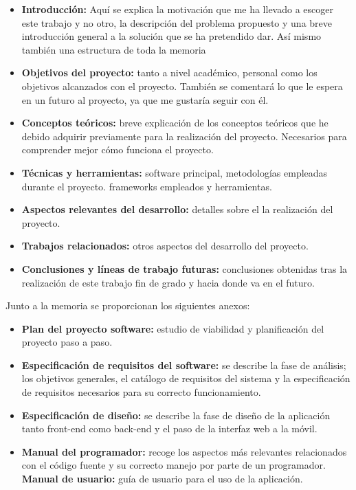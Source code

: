 \begin{itemize}
\tightlist
\item
  \textbf{Introducción:} Aquí se explica la motivación que me ha llevado a escoger este trabajo y no otro, la descripción del problema propuesto y una breve introducción general a la solución que se ha pretendido dar. Así mismo también una estructura de toda la memoria 
\item
  \textbf{Objetivos del proyecto:} tanto a nivel académico, personal como los objetivos alcanzados con el proyecto. También se comentará lo que le espera en un futuro al proyecto, ya que me gustaría seguir con él.
\item
  \textbf{Conceptos teóricos:} breve explicación de los conceptos
  teóricos que he debido adquirir previamente para la realización del proyecto. Necesarios para comprender mejor cómo funciona el proyecto.
\item
  \textbf{Técnicas y herramientas:} software principal, metodologías empleadas durante el proyecto. frameworks empleados y herramientas.
\item
  \textbf{Aspectos relevantes del desarrollo:} detalles sobre el la realización del proyecto.
\item
  \textbf{Trabajos relacionados:} otros aspectos del desarrollo del proyecto.
\item
  \textbf{Conclusiones y líneas de trabajo futuras:} conclusiones
  obtenidas tras la realización de este trabajo fin de grado y hacia donde va en el futuro.
\end{itemize}

Junto a la memoria se proporcionan los siguientes anexos:

\begin{itemize}
\tightlist
\item
  \textbf{Plan del proyecto software:} estudio de viabilidad y planificación del proyecto paso a paso.
\item
  \textbf{Especificación de requisitos del software:} se describe la
  fase de análisis; los objetivos generales, el catálogo de requisitos
  del sistema y la especificación de requisitos necesarios para su correcto funcionamiento.
\item
  \textbf{Especificación de diseño:} se describe la fase de diseño de la aplicación tanto front-end como back-end y el paso de la interfaz web a la móvil.
\item
  \textbf{Manual del programador:} recoge los aspectos más relevantes
  relacionados con el código fuente y su correcto manejo por parte de un programador.
  \textbf{Manual de usuario:} guía de usuario para el uso de la aplicación.
\end{itemize}

